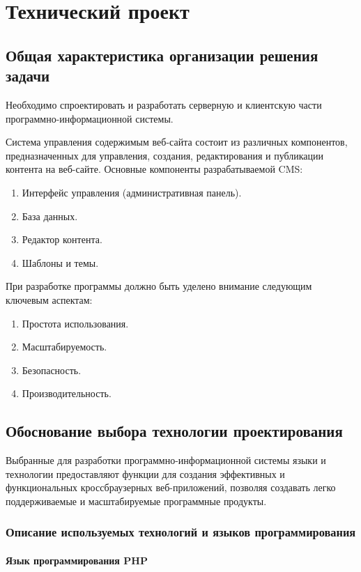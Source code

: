 \section{Технический проект}
\subsection{Общая характеристика организации решения задачи}

Необходимо спроектировать и разработать серверную и клиентскую части программно-информационной системы.

Система управления содержимым веб-сайта состоит из различных компонентов, предназначенных для управления, создания, редактирования и публикации контента на веб-сайте. Основные компоненты разрабатываемой CMS:
\begin{enumerate}
	\item Интерфейс управления (административная панель).
	\item База данных.
	\item Редактор контента.
	\item Шаблоны и темы.
\end{enumerate}

При разработке программы должно быть уделено внимание следующим ключевым аспектам:
\begin{enumerate}
	\item Простота использования.
	\item Масштабируемость.
	\item Безопасность.
	\item Производительность.
\end{enumerate}

\subsection{Обоснование выбора технологии проектирования}

Выбранные для разработки программно-информационной системы языки и технологии предоставляют функции для создания эффективных и функциональных кроссбраузерных веб-приложений, позволяя создавать легко поддерживаемые и масштабируемые программные продукты.

\subsubsection{Описание используемых технологий и языков программирования}


\paragraph{Язык программирования PHP}

